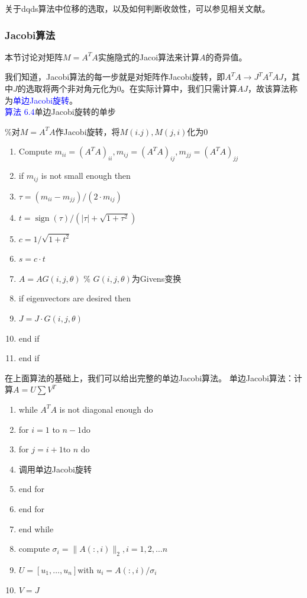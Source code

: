 \documentclass[12pt,a4paper]{article}
\begin{document}
关于dqds算法中位移的选取，以及如何判断收敛性，可以参见相关文献。
\subsubsection{Jacobi算法}
本节讨论对矩阵$M=A^TA$实施隐式的Jacoi算法来计算$A$的奇异值。

我们知道，Jacobi算法的每一步就是对矩阵作Jacobi旋转，即$A^TA\rightarrow J^TA^TAJ$，其中$J$的选取将两个非对角元化为0。在实际计算中，我们只需计算$AJ$，故该算法称为\textcolor{blue}{单边Jacobi旋转}。\\
\textcolor{blue}{算法 6.4}\quad 单边Jacobi旋转的单步

\%对$M=A^TA$作Jacobi旋转，将$M(i.j),M(j,i)$化为0
\begin{enumerate}[1:]
	\item Compute $m_{ii}=(A^TA)_{ii},m_{ij}=(A^TA)_{ij},m_{jj}=(A^TA)_{jj}$
	\item if $m_{ij}$ is not small enough then 
	\item \quad $\tau=\left(m_{i i}-m_{j j}\right) / \left(2 \cdot m_{i j}\right)$
	\item \quad $t=\operatorname{sign}(\tau) /\left(|\tau|+\sqrt{1+\tau^{2}}\right)$
	\item \quad $c=1 / \sqrt{1+t^{2}}$
	\item \quad $s=c·t$
	\item \quad $A=A G(i, j, \theta)$ \qquad \% $G(i,j,\theta)$为Givens变换
	\item \quad if eigenvectors are desired then
	\item \qquad $J=J·G(i, j, \theta)$
	\item \quad end if
	\item end if
\end{enumerate}

在上面算法的基础上，我们可以给出完整的单边Jacobi算法。
\quad 单边Jacobi算法：计算$A=U\sum V^T$
\begin{enumerate}[1:]
	\item while $A^TA$ is not diagonal enough do
	\item \quad for $i=1$ to $n-1$do
	\item \qquad for $j=i+1$to $n$ do
	\item \qquad \quad 调用单边Jacobi旋转
	\item \qquad end for 
	\item \quad end for 
	\item end while 
	\item compute $\sigma_{i}=\|A( :, i)\|_{2}, i=1,2, \ldots n$
	\item $U=\left[u_{1}, \dots, u_{n}\right]$with $u_{i}=A( :, i) / \sigma_{i}$
	\item $V=J$
\end{enumerate}
\end{document}
